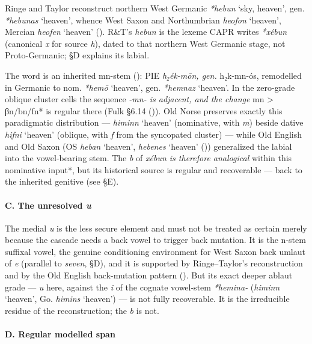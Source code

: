 \documentclass[
  british,
  a4paper,
]{article}
\providecommand{\Recon}[1]{\emph{*#1}}
\begin{document}
Ringe and Taylor reconstruct northern West Germanic \Recon{hebun} `sky,
heaven', gen. \Recon{hebunas} `heaven', whence West Saxon and
Northumbrian {\emph{heofon}} `heaven', Mercian {\emph{heofen}} `heaven'
().
R\&T's \emph{hebun} is the lexeme CAPR writes \emph{*xébun} (canonical
\emph{x} for source \emph{h}), dated to that northern West Germanic
stage, not Proto-Germanic; §D explains its labial.

The word is an inherited mn-stem (): PIE \emph{h₂ék-mōn, gen. }h₂k-mn-ós, remodelled in Germanic
to nom. \Recon{hemō} `heaven', gen. \Recon{hemnaz} `heaven'. In the
zero-grade oblique cluster cells the sequence \emph{-mn- is adjacent,
and the change }mn \textgreater{} βn/bn/fn* is regular there (Fulk §6.14
()). Old Norse preserves exactly
this paradigmatic distribution --- {\emph{himinn}} `heaven' (nominative,
with \emph{m}) beside dative {\emph{hifni}} `heaven' (oblique, with
\emph{f} from the syncopated cluster) --- while Old English and Old
Saxon (OS {\emph{heban}} `heaven', {\emph{hebenes}} `heaven'
()) generalized the labial into the
vowel-bearing stem. The \emph{b} of \emph{xébun is therefore analogical
}within this nominative input*, but its historical source is regular and
recoverable --- back to the inherited genitive (see §E).

\paragraph{\texorpdfstring{C. The unresolved
\emph{u}}{C. The unresolved u}}\label{c.-the-unresolved-u}

The medial \emph{u} is the less secure element and must not be treated
as certain merely because the cascade needs a back vowel to trigger back
mutation. It is the n-stem suffixal vowel, the genuine conditioning
environment for West Saxon back umlaut of \emph{e} (parallel to
\emph{seven}, §D), and it is supported by Ringe--Taylor's reconstruction
and by the Old English back-mutation pattern
(). But its
exact deeper ablaut grade --- \emph{u} here, against the \emph{i} of the
cognate vowel-stem \Recon{hemina-} ({\emph{himinn}} `heaven', Go.
{\emph{himins}} `heaven') --- is not fully recoverable. It is the
irreducible residue of the reconstruction; the \emph{b} is not.

\paragraph{D. Regular modelled span}\label{d.-regular-modelled-span}
\end{document}
